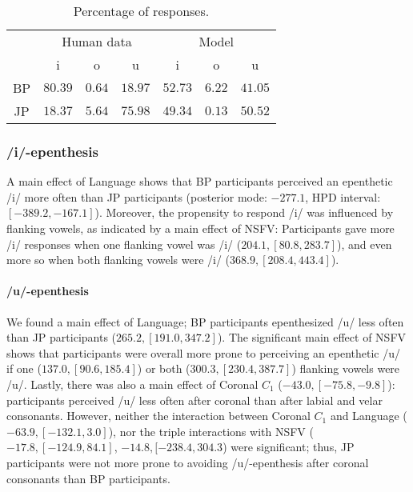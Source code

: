 \begin{table}[th]
  \caption{Percentage of responses.}
  \label{tab:model_overall}
\centering
    \begin{tabular}{ccccccc}
    \toprule
        & \multicolumn{3}{c}{Human data} & \multicolumn{3}{c}{Model} \\
        \cmidrule(lr){2-4}\cmidrule(lr){5-7} 
        & i & o & u & i & o & u \\ 
    \midrule
        BP & $80.39$ & $0.64$ & $18.97$ & $52.73$ & $6.22$ & $41.05$ \\ 
        JP & $18.37$ & $5.64$ & $75.98$ & $49.34$ & $0.13$ & $50.52$ \\ 
    \bottomrule
    \end{tabular}
\end{table}

\subsubsection{/i/-epenthesis}

A main effect of Language shows that BP participants perceived an epenthetic /i/ more often than JP participants (posterior mode: $-277.1$, HPD interval: $[-389.2, -167.1]$). Moreover, the propensity to respond /i/ was influenced by flanking vowels, as indicated by a main effect of NSFV: Participants gave more /i/ responses when one flanking vowel was /i/ ($204.1, [80.8, 283.7]$), and even more so when both flanking vowels were /i/ ($368.9, [208.4, 443.4]$). 

\paragraph{/u/-epenthesis}

We found a main effect of Language; BP participants epenthesized /u/ less often than JP participants ($265.2, [191.0, 347.2]$). The significant main effect of NSFV shows that participants were overall more prone to perceiving an epenthetic /u/ if one ($137.0, [90.6, 185.4]$) or both ($300.3, [230.4, 387.7]$) flanking vowels were /u/. Lastly, there was also a main effect of Coronal $C_{1}$ ($-43.0, [-75.8, -9.8]$): participants perceived /u/ less often after coronal than after labial and velar consonants. However, neither the interaction between Coronal $C_{1}$ and Language ($-63.9, [-132.1, 3.0]$), nor the triple interactions with NSFV ($-17.8, [-124.9, 84.1]$, $-14.8, [-238.4, 304.3$) were significant; thus, JP participants were not more prone to avoiding /u/-epenthesis after coronal consonants than BP participants. 

